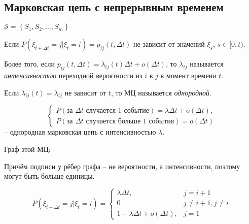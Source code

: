 \subsection{Марковская цепь с непрерывным временем}

$\mathcal{S} = \left\{ S_1, S_2, \dots, S_m \right\}$

\begin{definition}
  Если $P(\xi_{t+\Delta t} = j | \xi_t = i) = p_{ij}(t, \Delta t)$ не зависит от значений $\xi_s$, 
  $s \in [0, t)$.

  Более того, если $p_{ij}(t, \Delta t) = \lambda_{ij}(t) \Delta t + o(\Delta t)$, 
  то $\lambda_{ij} $ называется \emph{интенсивностью} переходной вероятности
  из $i$ в $j$ в момент времени $t$.

  Если $\lambda_{ij} (t) = \lambda_{ij}$ не зависит от $t$, то МЦ называется \emph{однородной}.
\end{definition}

\begin{ex}
  \[
    \begin{cases}
      P(\text{за $\Delta t$ случается 1 событие}) = \lambda \Delta t + o(\Delta t), \\
      P(\text{за $\Delta t$ случается больше 1 события}) = o(\Delta t)
    \end{cases}
  \]
  -- однородная марковская цепь с интенсивностью $\lambda$.


  Граф этой МЦ:
  \begin{figure}[h!]
    \centering
  \end{figure}

  Причём подписи у рёбер графа -- не вероятности, а интенсивности, поэтому могут
  быть больше единицы.

  \[
    P(\xi_{t+\Delta t} = j | \xi_t = i) = \begin{cases}
      \lambda \Delta t, & j = i+1 \\
      0 & j \neq i+1, j \neq i \\
      1-\lambda \Delta t + o(\Delta t), & j =1
    \end{cases}
  \]
\end{ex}


